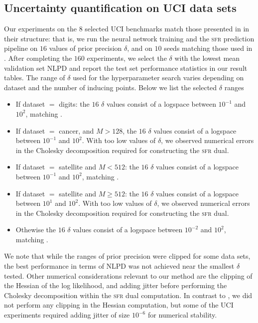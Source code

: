 \documentclass{article}
\newcommand{\our}{\textsc{sfr}\xspace}
\begin{document}
\subsection{Uncertainty quantification on UCI data sets}\label{app:uci}
Our experiments on the $8$ selected UCI benchmarks \cite{UCI} match those presented in \cite{immer2021improving} in their structure: that is, we run the neural network training and the \our prediction pipeline on $16$ values of prior precision $\delta$, and on $10$ seeds matching those used in \cite{immer2021improving}. After completing the $160$ experiments, we select the $\delta$ with the lowest mean validation set NLPD and report the test set performance statistics in our result tables. The range of $\delta$ used for the hyperparameter search varies depending on dataset and the number of inducing points. Below we list the selected $\delta$ ranges 
\begin{itemize}
\item If dataset $ = $ {\sc digits}: the $16$ $\delta$ values consist of a logspace between $10^{-1}$ and $10^2$, matching \citet{immer2021improving}.
\item If dataset $= $ {\sc cancer},  and $M > 128$, the $16$ $\delta$ values consist of a logspace between $10^{-1}$ and $10^2$. With too low values of $\delta$, we observed numerical errors in the Cholesky decomposition required for constructing the \our dual.
\item If dataset $=$ {\sc satellite} and $M < 512$: the $16$ $\delta$ values consist of a logspace between $10^{-1}$ and $10^2$, matching \citet{immer2021improving}.
\item If dataset $=$ {\sc satellite} and $M \geq 512$: the $16$ $\delta$ values consist of a logspace between $10^{1}$ and $10^2$.  With too low values of $\delta$, we observed numerical errors in the Cholesky decomposition required for constructing the \our dual.
\item Othewise  the $16$ $\delta$ values consist of a logspace between $10^{-2}$ and $10^2$, matching \citet{immer2021improving}.
\end{itemize}
We note that while the ranges of prior precision were clipped for some data sets, the best performance in terms of NLPD was not achieved near the smallest $\delta$ tested. Other numerical considerations relevant to our method are the clipping of the Hessian of the log likelihood, and adding jitter before performing the Cholesky decomposition within the \our dual computation. In contrast to \citet{immer2021improving}, we did not perform any clipping in the Hessian computation, but some of the UCI experiments required adding jitter of size $10^{-6}$ for numerical stability.  
\end{document}
